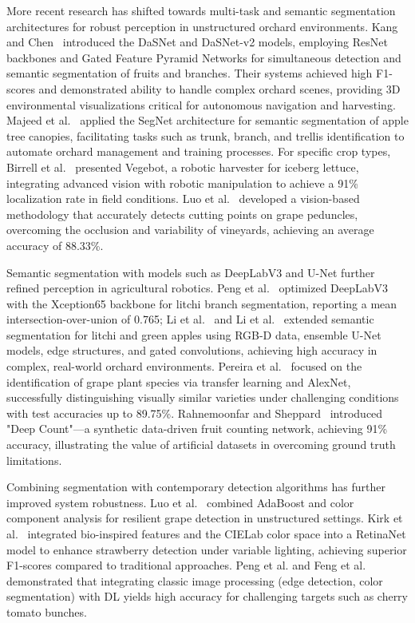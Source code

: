 \documentclass[a4paper,fleqn]{cas-dc}
\begin{document}
More recent research has shifted towards multi-task and semantic segmentation architectures for robust perception in unstructured orchard environments. Kang and Chen~\cite{kang2019fruit, kang2020fruit} introduced the DaSNet and DaSNet-v2 models, employing ResNet backbones and Gated Feature Pyramid Networks for simultaneous detection and semantic segmentation of fruits and branches. Their systems achieved high F1-scores and demonstrated ability to handle complex orchard scenes, providing 3D environmental visualizations critical for autonomous navigation and harvesting. Majeed et al.~\cite{majeed2020deep} applied the SegNet architecture for semantic segmentation of apple tree canopies, facilitating tasks such as trunk, branch, and trellis identification to automate orchard management and training processes.
For specific crop types, Birrell et al.~\cite{birrell2020field} presented Vegebot, a robotic harvester for iceberg lettuce, integrating advanced vision with robotic manipulation to achieve a 91\% localization rate in field conditions. Luo et al.~\cite{luo2018vision} developed a vision-based methodology that accurately detects cutting points on grape peduncles, overcoming the occlusion and variability of vineyards, achieving an average accuracy of 88.33\%.

Semantic segmentation with models such as DeepLabV3 and U-Net further refined perception in agricultural robotics. Peng et al.~\cite{peng2020semantic} optimized DeepLabV3 with the Xception65 backbone for litchi branch segmentation, reporting a mean intersection-over-union of 0.765; Li et al.~\cite{li2020detection} and Li et al.~\cite{li2021novel} extended semantic segmentation for litchi and green apples using RGB-D data, ensemble U-Net models, edge structures, and gated convolutions, achieving high accuracy in complex, real-world orchard environments.
Pereira et al.~\cite{pereira2019deep} focused on the identification of grape plant species via transfer learning and AlexNet, successfully distinguishing visually similar varieties under challenging conditions with test accuracies up to 89.75\%. Rahnemoonfar and Sheppard~\cite{rahnemoonfar2017deep} introduced "Deep Count"—a synthetic data-driven fruit counting network, achieving 91\% accuracy, illustrating the value of artificial datasets in overcoming ground truth limitations.

Combining segmentation with contemporary detection algorithms has further improved system robustness. Luo et al.~\cite{luo2016robust} combined AdaBoost and color component analysis for resilient grape detection in unstructured settings. Kirk et al.~\cite{kirk2020b} integrated bio-inspired features and the CIELab color space into a RetinaNet model to enhance strawberry detection under variable lighting, achieving superior F1-scores compared to traditional approaches. Peng et al.\cite{peng2018general} and Feng et al.~\cite{feng2018} demonstrated that integrating classic image processing (edge detection, color segmentation) with DL yields high accuracy for challenging targets such as cherry tomato bunches.
\end{document}

